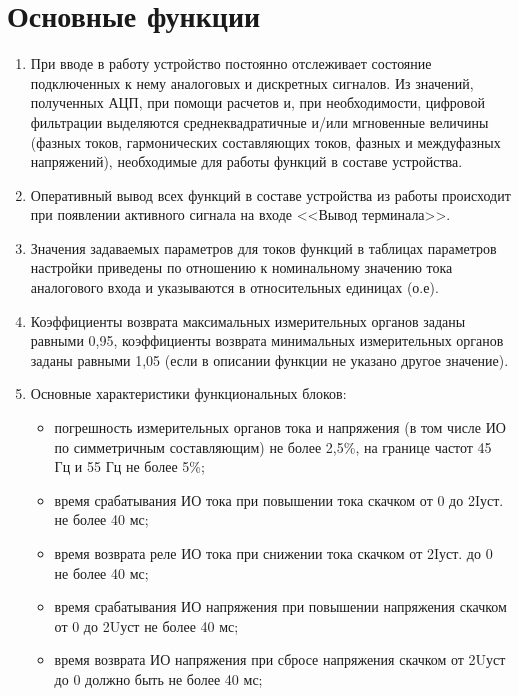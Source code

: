 \color{unimain}\section[Основные функции]{Основные функции}\label{sec:funcs}
\color{black}

\color{black}

\begin{enumerate}
    
\item
При вводе в работу устройство постоянно отслеживает состояние подключенных к нему аналоговых и дискретных сигналов. Из значений, полученных АЦП, при помощи расчетов и, при необходимости, цифровой фильтрации выделяются среднеквадратичные и/или мгновенные величины (фазных токов, гармонических составляющих токов, фазных и междуфазных напряжений), необходимые для работы функций в составе устройства.
\item
Оперативный вывод всех функций в составе устройства из работы происходит при появлении активного сигнала на входе <<Вывод терминала>>.
\item
Значения задаваемых параметров для токов функций в таблицах параметров настройки приведены по отношению к номинальному значению тока аналогового входа и указываются в относительных единицах (о.е).
\item
Коэффициенты возврата максимальных измерительных органов заданы равными 0,95, коэффициенты возврата минимальных измерительных органов заданы равными 1,05 (если в описании функции не указано другое значение).
\item
Основные характеристики функциональных блоков:
\begin{itemize}
    \item погрешность измерительных органов тока и напряжения (в том числе ИО по симметричным составляющим) не более 2,5\%, на границе частот 45 Гц и 55 Гц не более 5\%;
    \item время срабатывания ИО тока при повышении тока скачком от 0 до 2Iуст. не более 40 мс;
    \item время возврата реле ИО тока при снижении тока скачком от 2Iуст. до 0 не более 40 мс;
    \item время срабатывания ИО напряжения при повышении напряжения скачком от 0 до 2Uуст не более 40 мс;
    \item время возврата ИО напряжения при сбросе напряжения скачком от 2Uуст до 0 должно быть не более 40 мс; 

\end{itemize}
\end{enumerate}
